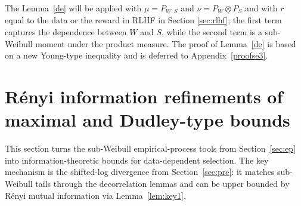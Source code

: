 \documentclass[11pt]{article}
\providecommand{\DD}{\mathcal{D}}
\providecommand{\Renyi}{R\'enyi }
\begin{document}
The Lemma~\ref{de} will be applied with $\mu=P_{W,S}$ and $\nu=P_W\otimes P_S$ and
with $r$ equal to the data or the reward in RLHF in Section \ref{sec:rlhf}; the first term captures the dependence
between $W$ and $S$, while the second term is a sub-Weibull moment under the
product measure.  The proof of Lemma~\ref{de} is based on a new Young-type
inequality and is deferred to Appendix~\ref{proofse3}.








\section{\Renyi information refinements of maximal and Dudley-type bounds}\label{sec:gen_bounds}



This section turns the sub-Weibull empirical-process tools from
Section~\ref{sec:ep} into information-theoretic bounds for data-dependent
selection. The key mechanism is the shifted-log divergence from
Section~\ref{sec:pre}: it matches sub-Weibull tails through the decorrelation
lemmas and can be upper bounded by R\'enyi mutual information via
Lemma~\ref{lem:key1}.
\end{document}
